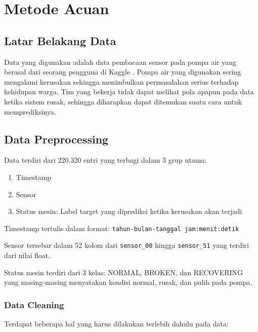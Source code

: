 \chapter{Metode Acuan}

\section{Latar Belakang Data}

Data yang digunakan adalah data pembacaan sensor pada pompa air yang berasal dari seorang pengguna di Kaggle \cite{pump_sensor_data}. Pompa air yang digunakan sering mengalami kerusakan sehingga menimbulkan permasalahan serius terhadap kehidupan warga. Tim yang bekerja tidak dapat melihat pola apapun pada data ketika sistem rusak, sehingga diharapkan dapat ditemukan suatu cara untuk memprediksinya.


\section{Data Preprocessing}

Data terdiri dari 220.320 entri yang terbagi dalam 3 grup utama:

\begin{enumerate}
    \item Timestamp
    \item Sensor
    \item Status mesin: Label target yang diprediksi ketika kerusakan akan terjadi
\end{enumerate}

Timestamp tertulis dalam format: \texttt{tahun-bulan-tanggal jam:menit:detik}

Sensor tersebar dalam 52 kolom dari \texttt{sensor\_00} hingga \texttt{sensor\_51} yang terdiri dari nilai float.

Status mesin terdiri dari 3 kelas: NORMAL, BROKEN, dan RECOVERING yang masing-masing menyatakan kondisi normal, rusak, dan pulih pada pompa.

    \subsection{Data Cleaning}

    Terdapat beberapa hal yang harus dilakukan terlebih dahulu pada data:

